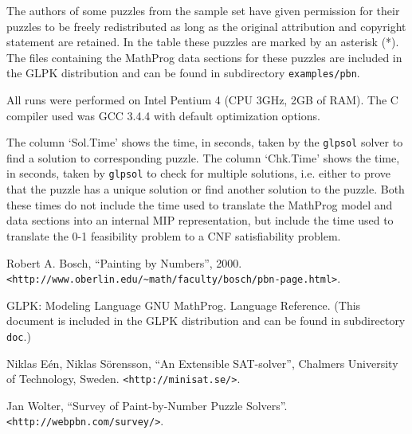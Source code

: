 \documentclass[11pt,draft]{article}
\begin{document}
The authors of some puzzles from the sample set have given permission
for their puzzles to be freely redistributed as long as the original
attribution and copyright statement are retained. In the table these
puzzles are marked by an asterisk (*). The files containing the
MathProg data sections for these puzzles are included in the GLPK
distribution and can be found in subdirectory \verb|examples/pbn|.

All runs were performed on Intel Pentium 4 (CPU 3GHz, 2GB of RAM).
The C compiler used was GCC 3.4.4 with default optimization options.

The column `Sol.Time' shows the time, in seconds, taken by the
\verb|glpsol| solver to find a solution to corresponding puzzle. The
column `Chk.Time' shows the time, in seconds, taken by \verb|glpsol| to
check for multiple solutions, i.e. either to prove that the puzzle has
a unique solution or find another solution to the puzzle. Both these
times do not include the time used to translate the MathProg model and
data sections into an internal MIP representation, but include the time
used to translate the 0-1 feasibility problem to a CNF satisfiability
problem.

\begin{thebibliography}{10}

Robert A. Bosch, ``Painting by Numbers'', 2000.\\
\verb|<http://www.oberlin.edu/~math/faculty/bosch/pbn-page.html>|.

GLPK: Modeling Language GNU MathProg. Language Reference. (This
document is included in the GLPK distribution and can be found in
subdirectory \verb|doc|.)

Niklas E\'en, Niklas S\"orensson, ``An Extensible SAT-solver'',
Chalmers University of Technology, Sweden. \verb|<http://minisat.se/>|.

Jan Wolter, ``Survey of Paint-by-Number Puzzle Solvers''.\\
\verb|<http://webpbn.com/survey/>|.

\end{thebibliography}

\newpage
\end{document}
